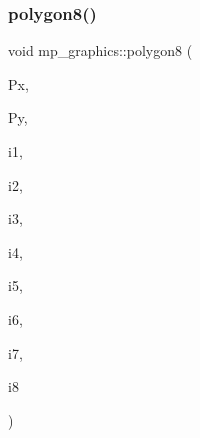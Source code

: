 \subsubsection{\texorpdfstring{polygon8()}{polygon8()}}
{\footnotesize\ttfamily void mp\+\_\+graphics\+::polygon8 (\begin{DoxyParamCaption}\item[{\mbox{\hyperlink{galois_8h_a09fddde158a3a20bd2dcadb609de11dc}{I\+NT}} $\ast$}]{Px,  }\item[{\mbox{\hyperlink{galois_8h_a09fddde158a3a20bd2dcadb609de11dc}{I\+NT}} $\ast$}]{Py,  }\item[{\mbox{\hyperlink{galois_8h_a09fddde158a3a20bd2dcadb609de11dc}{I\+NT}}}]{i1,  }\item[{\mbox{\hyperlink{galois_8h_a09fddde158a3a20bd2dcadb609de11dc}{I\+NT}}}]{i2,  }\item[{\mbox{\hyperlink{galois_8h_a09fddde158a3a20bd2dcadb609de11dc}{I\+NT}}}]{i3,  }\item[{\mbox{\hyperlink{galois_8h_a09fddde158a3a20bd2dcadb609de11dc}{I\+NT}}}]{i4,  }\item[{\mbox{\hyperlink{galois_8h_a09fddde158a3a20bd2dcadb609de11dc}{I\+NT}}}]{i5,  }\item[{\mbox{\hyperlink{galois_8h_a09fddde158a3a20bd2dcadb609de11dc}{I\+NT}}}]{i6,  }\item[{\mbox{\hyperlink{galois_8h_a09fddde158a3a20bd2dcadb609de11dc}{I\+NT}}}]{i7,  }\item[{\mbox{\hyperlink{galois_8h_a09fddde158a3a20bd2dcadb609de11dc}{I\+NT}}}]{i8 }\end{DoxyParamCaption})}

\mbox{\label{classmp__graphics_a6731b14ae757dc7ab3ac63c21c82af4d}} 
